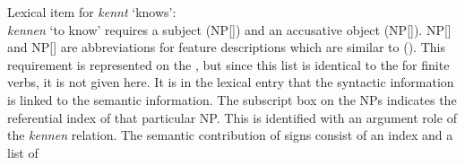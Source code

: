 \eas
Lexical item for \emph{kennt} `knows':\\
\label{le-kennt}
\zs
%
\emph{kennen} `to know' requires a subject (NP[]) and an accusative object (NP[]).
NP[] and NP[] are abbreviations for feature descriptions which are similar to
(). This requirement is represented on the \argstl, but since this list is identical to the
\compsl for finite verbs, it is not given here. It is in the lexical entry that the syntactic
information is linked to the semantic information. The subscript box on the NPs indicates the
referential index of that particular NP. This is identified with an argument role of the
\emph{kennen} relation. The semantic contribution of signs consist of an index and a list of
